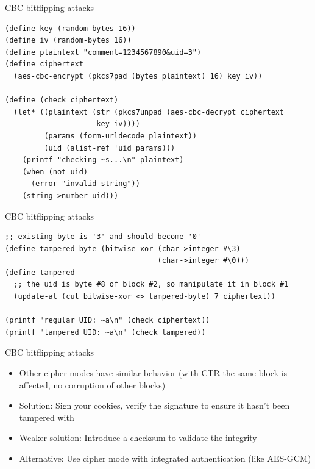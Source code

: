 \documentclass[presentation]{beamer}
\begin{document}
\begin{frame}[fragile,label=sec-2-19]{CBC bitflipping attacks}
 \begin{verbatim}
(define key (random-bytes 16))
(define iv (random-bytes 16))
(define plaintext "comment=1234567890&uid=3")
(define ciphertext
  (aes-cbc-encrypt (pkcs7pad (bytes plaintext) 16) key iv))

(define (check ciphertext)
  (let* ((plaintext (str (pkcs7unpad (aes-cbc-decrypt ciphertext
                     key iv))))
         (params (form-urldecode plaintext))
         (uid (alist-ref 'uid params)))
    (printf "checking ~s...\n" plaintext)
    (when (not uid)
      (error "invalid string"))
    (string->number uid)))
\end{verbatim}
\end{frame}

\begin{frame}[fragile,label=sec-2-20]{CBC bitflipping attacks}
 \begin{verbatim}
;; existing byte is '3' and should become '0'
(define tampered-byte (bitwise-xor (char->integer #\3)
                                   (char->integer #\0)))
(define tampered
  ;; the uid is byte #8 of block #2, so manipulate it in block #1
  (update-at (cut bitwise-xor <> tampered-byte) 7 ciphertext))

(printf "regular UID: ~a\n" (check ciphertext))
(printf "tampered UID: ~a\n" (check tampered))
\end{verbatim}
\end{frame}

\begin{frame}[label=sec-2-21]{CBC bitflipping attacks}
\begin{itemize}
\item Other cipher modes have similar behavior (with CTR the same block is
affected, no corruption of other blocks)
\item Solution: Sign your cookies, verify the signature to ensure it
hasn't been tampered with
\item Weaker solution: Introduce a checksum to validate the integrity
\item Alternative: Use cipher mode with integrated authentication (like
AES-GCM)
\end{itemize}
\end{frame}
\end{document}

